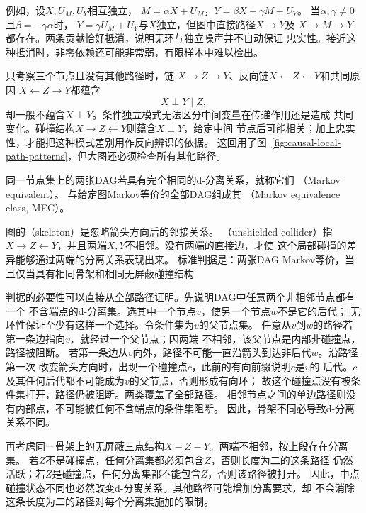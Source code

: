 例如，设\(X,U_M,U_Y\)相互独立，
\(M=\alpha X+U_M\)，\(Y=\beta X+\gamma M+U_Y\)。
当\(\alpha,\gamma\ne0\)且\(\beta=-\gamma\alpha\)时，
\(Y=\gamma U_M+U_Y\)与\(X\)独立，但图中直接路径\(X\to Y\)及
\(X\to M\to Y\)都存在。两条贡献恰好抵消，说明无环与独立噪声并不自动保证
忠实性。接近这种抵消时，非零依赖还可能非常弱，有限样本中难以检出。

只考察三个节点且没有其他路径时，链
\(X\to Z\to Y\)、反向链\(X\leftarrow Z\leftarrow Y\)和共同原因
\(X\leftarrow Z\to Y\)都蕴含
\[
  X\perp Y\mid Z,
\]
却一般不蕴含\(X\perp Y\)。条件独立模式无法区分中间变量在传递作用还是造成
共同变化。碰撞结构\(X\to Z\leftarrow Y\)则蕴含\(X\perp Y\)，给定中间
节点后可能相关；加上忠实性，才能把这种模式差别用作反向辨识的依据。
这回用了图~\ref{fig:causal-local-path-patterns}，但大图还必须检查所有其他路径。

\begin{definition}[Markov等价与等价类]
  \label{def:causal-markov-equivalence}
  同一节点集上的两张DAG若具有完全相同的d-分离关系，就称它们
  （Markov equivalent）。
  与给定图Markov等价的全部DAG组成其
  （Markov equivalence class, MEC）。
\end{definition}

图的（skeleton）是忽略箭头方向后的邻接关系。
（unshielded collider）指
\(X\to Z\leftarrow Y\)，并且两端\(X,Y\)不相邻。没有两端的直接边，才使
这个局部碰撞的差异能够通过两端的分离关系表现出来。
标准判据是：两张DAG Markov等价，当且仅当具有相同骨架和相同无屏蔽碰撞结构

判据的必要性可以直接从全部路径证明。先说明DAG中任意两个非相邻节点都有一个
不含端点的d-分离集。选其中一个节点\(v\)，使另一个节点\(w\)不是它的后代；
无环性保证至少有这样一个选择。令条件集为\(v\)的父节点集。
任意从\(v\)到\(w\)的路径若第一条边指向\(v\)，就经过一个父节点；因两端
不相邻，该父节点是内部非碰撞点，路径被阻断。
若第一条边从\(v\)向外，路径不可能一直沿箭头到达非后代\(w\)。沿路径第一次
改变箭头方向时，出现一个碰撞点\(c\)，此前的有向前缀说明\(c\)是\(v\)的
后代。\(c\)及其任何后代都不可能成为\(v\)的父节点，否则形成有向环；
故这个碰撞点没有被条件集打开，路径仍被阻断。两类覆盖了全部路径。
相邻节点之间的单边路径则没有内部点，不可能被任何不含端点的条件集阻断。
因此，骨架不同必导致d-分离关系不同。

再考虑同一骨架上的无屏蔽三点结构\(X-Z-Y\)。两端不相邻，按上段存在分离集。
若\(Z\)不是碰撞点，任何分离集都必须包含\(Z\)，否则长度为二的这条路径
仍然活跃；若\(Z\)是碰撞点，任何分离集都不能包含\(Z\)，否则该路径被打开。
因此，中点碰撞状态不同也必然改变d-分离关系。其他路径可能增加分离要求，却
不会消除这条长度为二的路径对每个分离集施加的限制。

